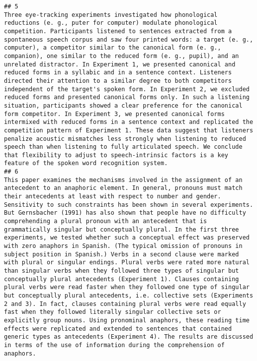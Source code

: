 \documentclass[
  english,
  man]{apa6}
\begin{document}
\begin{verbatim}
## 5                                                                                                                                                                                                                                                                                                                                                                                               Three eye-tracking experiments investigated how phonological reductions (e. g., puter for computer) modulate phonological competition. Participants listened to sentences extracted from a spontaneous speech corpus and saw four printed words: a target (e. g., computer), a competitor similar to the canonical form (e. g., companion), one similar to the reduced form (e. g., pupil), and an unrelated distractor. In Experiment 1, we presented canonical and reduced forms in a syllabic and in a sentence context. Listeners directed their attention to a similar degree to both competitors independent of the target's spoken form. In Experiment 2, we excluded reduced forms and presented canonical forms only. In such a listening situation, participants showed a clear preference for the canonical form competitor. In Experiment 3, we presented canonical forms intermixed with reduced forms in a sentence context and replicated the competition pattern of Experiment 1. These data suggest that listeners penalize acoustic mismatches less strongly when listening to reduced speech than when listening to fully articulated speech. We conclude that flexibility to adjust to speech-intrinsic factors is a key feature of the spoken word recognition system.
## 6                                                                                                                                                                                                            This paper examines the mechanisms involved in the assignment of an antecedent to an anaphoric element. In general, pronouns must match their antecedents at least with respect to number and gender. Sensitivity to such constraints has been shown in several experiments. But Gernsbacher (1991) has also shown that people have no difficulty comprehending a plural pronoun with an antecedent that is grammatically singular but conceptually plural. In the first three experiments, we tested whether such a conceptual effect was preserved with zero anaphors in Spanish. (The typical omission of pronouns in subject position in Spanish.) Verbs in a second clause were marked with plural or singular endings. Plural verbs were rated more natural than singular verbs when they followed three types of singular but conceptually plural antecedents (Experiment 1). Clauses containing plural verbs were read faster when they followed one type of singular but conceptually plural antecedents, i.e. collective sets (Experiments 2 and 3). In fact, clauses containing plural verbs were read equally fast when they followed literally singular collective sets or explicitly group nouns. Using pronominal anaphors, these reading time effects were replicated and extended to sentences that contained generic types as antecedents (Experiment 4). The results are discussed in terms of the use of information during the comprehension of anaphors.

\end{verbatim}
\end{document}
